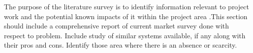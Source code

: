 The purpose of the literature survey is to identify information relevant to project work and the potential known impacts of it within the project area .This section should include a comprehensive report of current market survey done with respect to problem. Include study of similar systems available, if any along with their pros and cons. Identify those area where there is an absence or scarcity. 